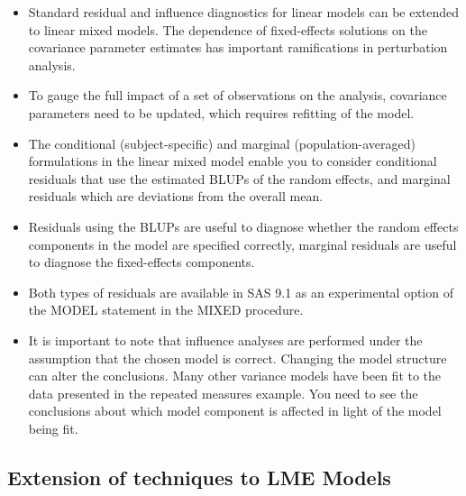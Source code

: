 \documentclass[12pt, a4paper]{article}
\begin{document}
\begin{itemize}
	\item Standard residual and inﬂuence diagnostics for linear models can be extended to linear mixed models. The dependence of ﬁxed-effects solutions on the covariance parameter estimates has important ramiﬁcations in perturbation analysis. 
	\item To gauge the full impact of a set of observations on the analysis, covariance parameters need to be updated, which requires reﬁtting of the model. 
	
	\item The conditional (subject-speciﬁc) and marginal (population-averaged) formulations in the linear mixed model enable you to consider conditional residuals that use the estimated BLUPs of the random effects, and marginal residuals which are deviations from the overall mean. 
	\item Residuals using the BLUPs are useful to diagnose whether the random effects components in the model are speciﬁed correctly, marginal residuals are useful to diagnose the ﬁxed-effects components. 
	\item Both types of residuals are available in SAS 9.1 as an experimental option of the MODEL statement in the MIXED procedure.
	
	\item It is important to note that influence analyses are performed under the assumption that the chosen model is correct. Changing the model structure can alter the conclusions. Many other variance models have been ﬁt to the data presented in the repeated measures example. You need to see the conclusions about which model component is affected in light of the model being fit.
\end{itemize}




\subsection*{Extension of techniques to LME Models} %
\end{document}
